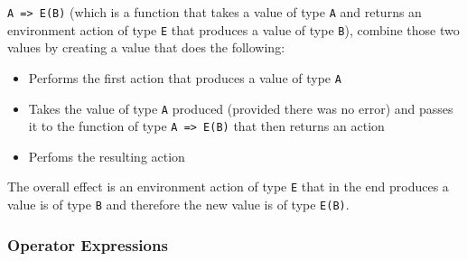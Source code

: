 \documentclass{article}
\begin{document}
\texttt{A => E(B)} (which is a function that takes a value of type \texttt{A}
and returns an environment action of type \texttt{E} that produces a value
of type \texttt{B}), combine those two values by creating a value that does the
following: 
\begin{itemize}
\item
Performs the first action that produces a value of type \texttt{A}

\item
Takes the value of type \texttt{A} produced (provided there was no error) and
passes it to the function of type \texttt{A => E(B)} that then returns an
action

\item
Perfoms the resulting action 
\end{itemize}
The overall effect is an environment action  of type \texttt{E} that in the end
produces a value is of type \texttt{B} and therefore the new value is of type
\texttt{E(B)}.

\subsubsection{Operator Expressions}
\end{document}

